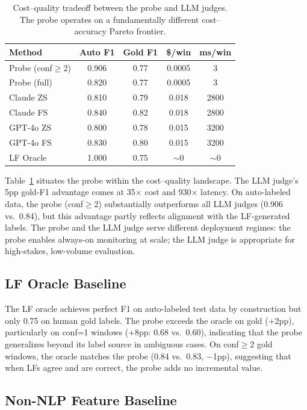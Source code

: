 \documentclass[11pt]{article}
\begin{document}
\begin{table}[t]
\centering
\small
\begin{tabular}{lcccc}
\toprule
\textbf{Method} & \textbf{Auto F1} & \textbf{Gold F1} & \textbf{\$/win} & \textbf{ms/win} \\
\midrule
Probe (conf$\geq$2) & 0.906 & 0.77 & 0.0005 & 3 \\
Probe (full) & 0.820 & 0.77 & 0.0005 & 3 \\
Claude ZS & 0.810 & 0.79 & 0.018 & 2800 \\
Claude FS & 0.840 & 0.82 & 0.018 & 2800 \\
GPT-4o ZS & 0.800 & 0.78 & 0.015 & 3200 \\
GPT-4o FS & 0.830 & 0.80 & 0.015 & 3200 \\
LF Oracle & 1.000 & 0.75 & $\sim$0 & $\sim$0 \\
\bottomrule
\end{tabular}
\caption{Cost--quality tradeoff between the probe and LLM judges. The probe operates on a fundamentally different cost--accuracy Pareto frontier.}
\label{tab:llm}
\end{table}

Table~\ref{tab:llm} situates the probe within the cost--quality landscape. The LLM judge's 5pp gold-F1 advantage comes at 35$\times$ cost and 930$\times$ latency. On auto-labeled data, the probe (conf$\geq$2) substantially outperforms all LLM judges (0.906 vs.\ 0.84), but this advantage partly reflects alignment with the LF-generated labels. The probe and the LLM judge serve different deployment regimes: the probe enables always-on monitoring at scale; the LLM judge is appropriate for high-stakes, low-volume evaluation.

\subsection{LF Oracle Baseline}

The LF oracle achieves perfect F1 on auto-labeled test data by construction but only 0.75 on human gold labels. The probe exceeds the oracle on gold (+2pp), particularly on conf=1 windows (+8pp: 0.68 vs.\ 0.60), indicating that the probe generalizes beyond its label source in ambiguous cases. On conf$\geq$2 gold windows, the oracle matches the probe (0.84 vs.\ 0.83, $-$1pp), suggesting that when LFs agree and are correct, the probe adds no incremental value.

\subsection{Non-NLP Feature Baseline}
\end{document}
